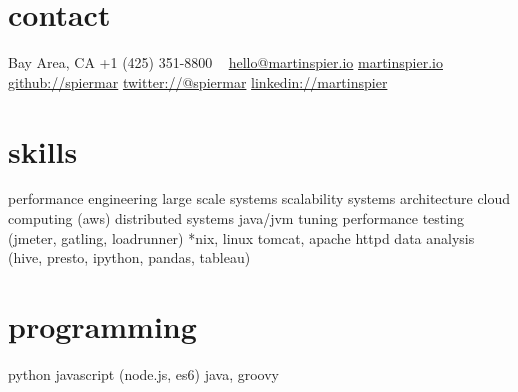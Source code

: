 \begin{aside}
    \section{contact}
        Bay Area, CA
        +1 (425) 351-8800
        ~
        \href{mailto:hello@martinspier.io}{hello@martinspier.io}
        \href{http://martinspier.io}{martinspier.io}
        \href{https://github.com/spiermar}{github://spiermar}
        \href{https://twitter.com/spiermar}{twitter://@spiermar}
        \href{https://www.linkedin.com/in/martinspier}{linkedin://martinspier}
    \section{skills}
        performance engineering
        large scale systems
        scalability
        systems architecture
        cloud computing
        (aws)
        distributed systems
        java/jvm tuning
        performance testing
        (jmeter, gatling, loadrunner)
        *nix, linux
        tomcat, apache httpd
        data analysis
        (hive, presto, ipython, pandas, tableau)
        \section{programming}
        python
        javascript
        (node.js, es6)
        java, groovy
\end{aside}